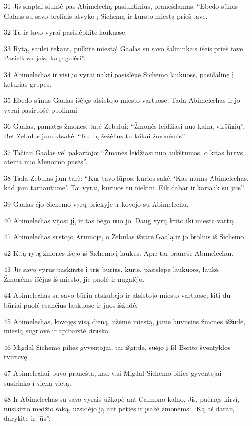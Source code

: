 \par 31 Jis slaptai siuntė pas Abimelechą pasiuntinius, pranešdamas: “Ebedo sūnus Galaas su savo broliais atvyko į Sichemą ir kursto miestą prieš tave. 
\par 32 Tu ir tavo vyrai pasislėpkite laukuose. 
\par 33 Rytą, saulei tekant, pulkite miestą! Gaalas su savo šalininkais išeis prieš tave. Pasielk su jais, kaip galėsi”. 
\par 34 Abimelechas ir visi jo vyrai naktį pasislėpė Sichemo laukuose, pasidalinę į keturias grupes. 
\par 35 Ebedo sūnus Gaalas išėjęs atsistojo miesto vartuose. Tada Abimelechas ir jo vyrai pasiruošė puolimui. 
\par 36 Gaalas, pamatęs žmones, tarė Zebului: “Žmonės leidžiasi nuo kalnų viršūnių”. Bet Zebulas jam atsakė: “Kalnų šešėlius tu laikai žmonėmis”. 
\par 37 Tačiau Gaalas vėl pakartojo: “Žmonės leidžiasi nuo aukštumos, o kitas būrys ateina nuo Menoimo pusės”. 
\par 38 Tada Zebulas jam tarė: “Kur tavo lūpos, kurios sakė: ‘Kas mums Abimelechas, kad jam tarnautume’. Tai vyrai, kuriuos tu niekini. Eik dabar ir kariauk su jais”. 
\par 39 Gaalas ėjo Sichemo vyrų priekyje ir kovojo su Abimelechu. 
\par 40 Abimelechas vijosi jį, ir tas bėgo nuo jo. Daug vyrų krito iki miesto vartų. 
\par 41 Abimelechas sustojo Arumoje, o Zebulas išvarė Gaalą ir jo brolius iš Sichemo. 
\par 42 Kitą rytą žmonės išėjo iš Sichemo į laukus. Apie tai pranešė Abimelechui. 
\par 43 Jis savo vyrus paskirstė į tris būrius, kurie, pasislėpę laukuose, laukė. Žmonėms išėjus iš miesto, jie puolė ir nugalėjo. 
\par 44 Abimelechas su savo būriu atskubėjo ir atsistojo miesto vartuose, kiti du būriai puolė esančius laukuose ir juos išžudė. 
\par 45 Abimelechas, kovojęs visą dieną, užėmė miestą, jame buvusius žmones išžudė, miestą sugriovė ir apibarstė druska. 
\par 46 Migdal Sichemo pilies gyventojai, tai išgirdę, suėjo į El Berito šventyklos tvirtovę. 
\par 47 Abimelechui buvo pranešta, kad visi Migdal Sichemo pilies gyventojai susirinko į vieną vietą. 
\par 48 Ir Abimelechas su savo vyrais užkopė ant Calmono kalno. Jis, paėmęs kirvį, nusikirto medžio šaką, užsidėjo ją ant peties ir įsakė žmonėms: “Ką aš darau, darykite ir jūs”. 
